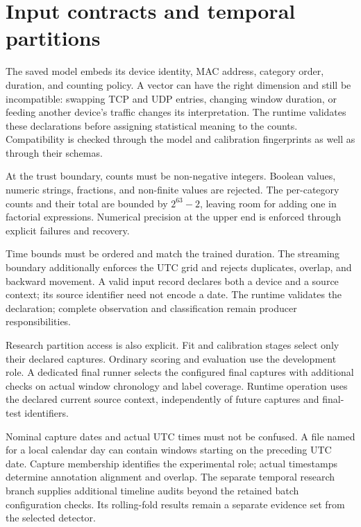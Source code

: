 \section{Input contracts and temporal partitions}
\label{sec:contracts}

The saved model embeds its device identity, MAC address, category order,
duration, and counting policy. A vector can have the right dimension and
still be incompatible: swapping TCP and UDP entries, changing window
duration, or feeding another device's traffic changes its interpretation.
The runtime validates these declarations before assigning statistical
meaning to the counts. Compatibility is checked through the model and
calibration fingerprints as well as through their schemas.

At the trust boundary, counts must be non-negative integers. Boolean
values, numeric strings, fractions, and non-finite values are rejected.
The per-category counts and their total are bounded by $2^{63}-2$, leaving
room for adding one in factorial expressions. Numerical precision at the
upper end is enforced through explicit failures and recovery.

Time bounds must be ordered and match the trained duration. The streaming
boundary additionally enforces the UTC grid and rejects duplicates,
overlap, and backward movement. A valid input record declares both a
device and a source context; its source identifier need not encode a date.
The runtime validates the declaration; complete observation and
classification remain producer responsibilities.

Research partition access is also explicit. Fit and calibration stages
select only their declared captures. Ordinary scoring and evaluation use
the development role. A dedicated final runner selects the configured
final captures with additional checks on actual window chronology and
label coverage. Runtime operation uses the declared current source context,
independently of future captures and final-test identifiers.

Nominal capture dates and actual UTC times must not be confused. A file
named for a local calendar day can contain windows starting on the
preceding UTC date. Capture membership identifies the experimental role;
actual timestamps determine annotation alignment and overlap. The
separate temporal research branch supplies additional timeline audits beyond
the retained batch configuration checks. Its rolling-fold results remain a
separate evidence set from the selected detector.

